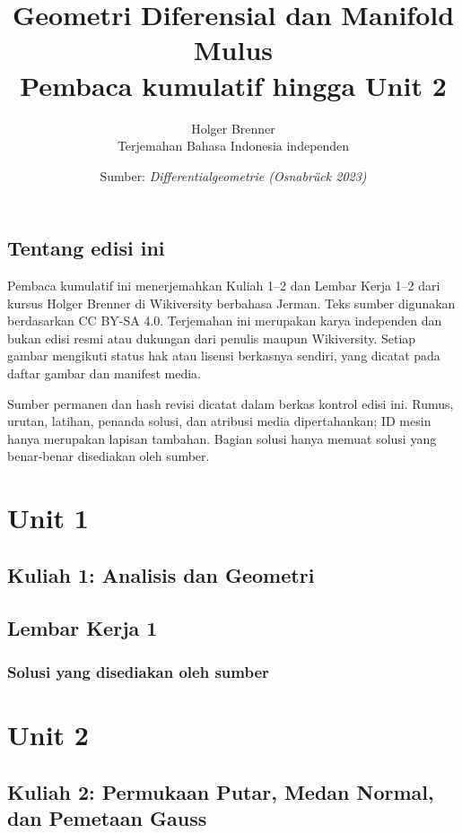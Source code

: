 \documentclass[11pt,a4paper,oneside]{book}
\title{Geometri Diferensial dan Manifold Mulus\\\large Pembaca kumulatif hingga Unit 2}
\author{Holger Brenner\\Terjemahan Bahasa Indonesia independen}
\date{Sumber: \textit{Differentialgeometrie (Osnabrück 2023)}}
\begin{document}
\hypersetup{pageanchor=false}
\maketitle
\hypersetup{pageanchor=true}
\frontmatter
\chapter*{Tentang edisi ini}
Pembaca kumulatif ini menerjemahkan Kuliah 1--2 dan Lembar Kerja 1--2 dari kursus Holger Brenner di Wikiversity berbahasa Jerman. Teks sumber digunakan berdasarkan CC BY-SA 4.0. Terjemahan ini merupakan karya independen dan bukan edisi resmi atau dukungan dari penulis maupun Wikiversity. Setiap gambar mengikuti status hak atau lisensi berkasnya sendiri, yang dicatat pada daftar gambar dan manifest media.

Sumber permanen dan hash revisi dicatat dalam berkas kontrol edisi ini. Rumus, urutan, latihan, penanda solusi, dan atribusi media dipertahankan; ID mesin hanya merupakan lapisan tambahan. Bagian solusi hanya memuat solusi yang benar-benar disediakan oleh sumber.
\tableofcontents

\mainmatter
\part{Unit 1}
\chapter[Kuliah 1]{Kuliah 1: Analisis dan Geometri}


\chapter{Lembar Kerja 1}


\section*{Solusi yang disediakan oleh sumber}


\part{Unit 2}
\chapter[Kuliah 2]{Kuliah 2: Permukaan Putar, Medan Normal, dan Pemetaan Gauss}

\end{document}
